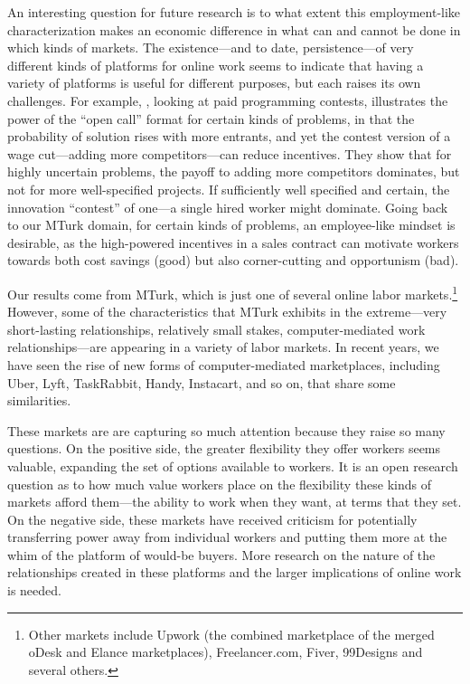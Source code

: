 \documentclass[11pt]{article}
\begin{document}
An interesting question for future research is to what extent this employment-like characterization makes an economic difference in what can and cannot be done in which kinds of markets.
The existence---and to date, persistence---of very different kinds of platforms for online work seems to indicate that having a variety of platforms is useful for different purposes, but each raises its own challenges.  
For example, \cite{boudreau2011incentives}, looking at paid programming contests, illustrates the power of the ``open call'' format for certain kinds of problems, in that the probability of solution rises with more entrants, and yet the contest version of a wage cut---adding more competitors---can reduce incentives.
They show that for highly uncertain problems, the payoff to adding more competitors dominates, but not for more well-specified projects.
If sufficiently well specified and certain, the innovation ``contest'' of one---a single hired worker might dominate.  
Going back to our MTurk domain, for certain kinds of problems, an employee-like mindset is desirable, as the high-powered incentives in a sales contract can motivate workers towards both cost savings (good) but also corner-cutting and opportunism (bad).

Our results come from MTurk, which is just one of several online labor markets.\footnote{
  Other markets include Upwork (the combined marketplace of the merged oDesk and Elance marketplaces), Freelancer.com, Fiver, 99Designs and several others.
}
However, some of the characteristics that MTurk exhibits in the extreme---very short-lasting relationships, relatively small stakes, computer-mediated work relationships---are appearing in a variety of labor markets.
In recent years, we have seen the rise of new forms of computer-mediated marketplaces, including Uber, Lyft, TaskRabbit, Handy, Instacart, and so on, that share some similarities. 

These markets are are capturing so much attention because they raise so many questions.
On the positive side, the greater flexibility they offer workers seems valuable, expanding the set of options available to workers.
It is an open research question as to how much value workers place on the flexibility these kinds of markets afford them---the ability to work when they want, at terms that they set.
On the negative side, these markets have received criticism for potentially transferring power away from individual workers and putting them more at the whim of the platform of would-be buyers.  
More research on the nature of the relationships created in these platforms and the larger implications of online work is needed. 
\end{document}
